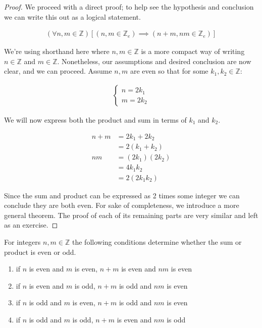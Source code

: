 \documentclass[twoside]{report}
\begin{document}
\begin{proof}
	We proceed with a direct proof; to help see the hypothesis and conclusion we can write this out as a logical statement.
	
	\begin{align*}
		(\forall n, m \in \mathbb{Z})[(n, m \in \mathbb{Z}_e) \implies (n + m, nm \in \mathbb{Z}_e)]
	\end{align*}
	
	We're using shorthand here where $n, m \in \mathbb{Z}$ is a more compact way of writing $n \in \mathbb{Z}$ and $m \in \mathbb{Z}$. Nonetheless, our assumptions and desired conclusion are now clear, and we can proceed. Assume $n, m$ are even so that for some $k_1, k_2 \in \mathbb{Z}$:
	
	\begin{align*}
		\begin{cases}
			n = 2 k_1 \\
			m = 2 k_2
		\end{cases}
	\end{align*} 
	
	We will now express both the product and sum in terms of $k_1$ and $k_2$.
	
	\begin{align*}
		n + m &= 2 k_1 + 2 k_2 \\
		&= 2 (k_1 + k_2) \\
		nm &= (2 k_1)(2 k_2) \\
		&= 4 k_1 k_2 \\
		&= 2 (2 k_1 k_2)
	\end{align*}
	
	Since the sum and product can be expressed as 2 times some integer we can conclude they are both even. For sake of completeness, we introduce a more general theorem. The proof of each of its remaining parts are very similar and left as an exercise.
\end{proof}
\vspace{\baselineskip}

\begin{theorem}
	For integers $n, m \in \mathbb{Z}$ the following conditions determine whether the sum or product is even or odd.
	
	\begin{enumerate}
		\item if $n$ is even and $m$ is even, $n + m$ is even and $nm$ is even
		\item if $n$ is even and $m$ is odd, $n + m$ is odd and $nm$ is even
		\item if $n$ is odd and $m$ is even, $n + m$ is odd and $nm$ is even
		\item if $n$ is odd and $m$ is odd, $n + m$ is even and $nm$ is odd
	\end{enumerate}
\end{theorem}
\vspace{\baselineskip}
\end{document}
